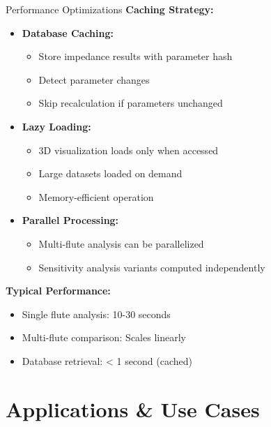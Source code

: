 \documentclass[aspectratio=169,10pt]{beamer}
\begin{document}
\begin{frame}{Performance Optimizations}
\textbf{Caching Strategy:}

\begin{itemize}
    \item \textbf{Database Caching:}
    \begin{itemize}
        \item Store impedance results with parameter hash
        \item Detect parameter changes
        \item Skip recalculation if parameters unchanged
    \end{itemize}
    
    \item \textbf{Lazy Loading:}
    \begin{itemize}
        \item 3D visualization loads only when accessed
        \item Large datasets loaded on demand
        \item Memory-efficient operation
    \end{itemize}
    
    \item \textbf{Parallel Processing:}
    \begin{itemize}
        \item Multi-flute analysis can be parallelized
        \item Sensitivity analysis variants computed independently
    \end{itemize}
\end{itemize}

\textbf{Typical Performance:}
\begin{itemize}
    \item Single flute analysis: 10-30 seconds
    \item Multi-flute comparison: Scales linearly
    \item Database retrieval: < 1 second (cached)
\end{itemize}
\end{frame}

\section{Applications \& Use Cases}
\end{document}
